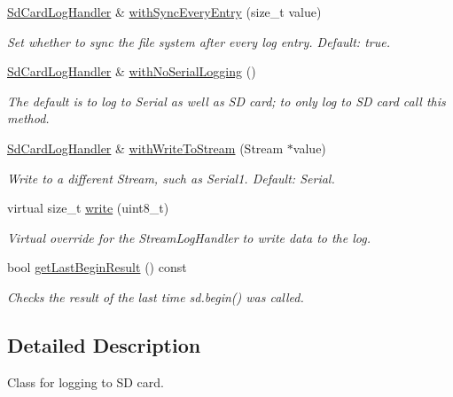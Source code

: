 \begin{DoxyCompactItemize}
\mbox{\hyperlink{class_sd_card_log_handler}{Sd\+Card\+Log\+Handler}} \& \mbox{\hyperlink{class_sd_card_log_handler_a761f6d348e72d349d31d07835fde5608}{with\+Sync\+Every\+Entry}} (size\+\_\+t value)
\begin{DoxyCompactList}\small\item\em Set whether to sync the file system after every log entry. Default\+: true. \end{DoxyCompactList}\item 
\mbox{\hyperlink{class_sd_card_log_handler}{Sd\+Card\+Log\+Handler}} \& \mbox{\hyperlink{class_sd_card_log_handler_a4ca51820470fb98d58944126522d12dd}{with\+No\+Serial\+Logging}} ()
\begin{DoxyCompactList}\small\item\em The default is to log to Serial as well as SD card; to only log to SD card call this method. \end{DoxyCompactList}\item 
\mbox{\hyperlink{class_sd_card_log_handler}{Sd\+Card\+Log\+Handler}} \& \mbox{\hyperlink{class_sd_card_log_handler_aca341088fe42f1e1dcfbabfbce0da529}{with\+Write\+To\+Stream}} (Stream $\ast$value)
\begin{DoxyCompactList}\small\item\em Write to a different Stream, such as Serial1. Default\+: Serial. \end{DoxyCompactList}\item 
\mbox{\label{class_sd_card_log_handler_aaf48dcdc1f7b0965e66cbc976f4e12e0}} 
virtual size\+\_\+t \mbox{\hyperlink{class_sd_card_log_handler_aaf48dcdc1f7b0965e66cbc976f4e12e0}{write}} (uint8\+\_\+t)
\begin{DoxyCompactList}\small\item\em Virtual override for the Stream\+Log\+Handler to write data to the log. \end{DoxyCompactList}\item 
bool \mbox{\hyperlink{class_sd_card_log_handler_aa3fae090c48b5c3618adc3a321679d0e}{get\+Last\+Begin\+Result}} () const
\begin{DoxyCompactList}\small\item\em Checks the result of the last time sd.\+begin() was called. \end{DoxyCompactList}\end{DoxyCompactItemize}


\subsection{Detailed Description}
Class for logging to SD card. 

